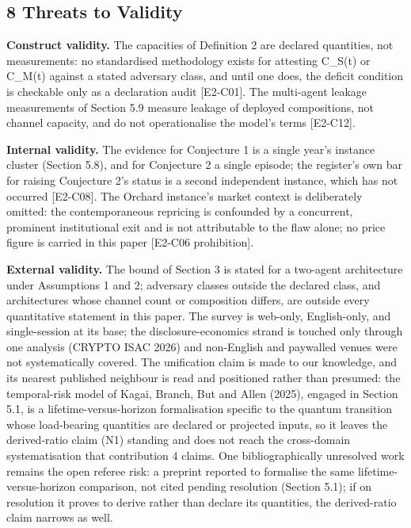 \documentclass[
  11pt,
]{article}
\begin{document}
\subsection{8 Threats to Validity}\label{threats-to-validity}

\textbf{Construct validity.} The capacities of Definition 2 are declared
quantities, not measurements: no standardised methodology exists for
attesting C\_S(t) or C\_M(t) against a stated adversary class, and until
one does, the deficit condition is checkable only as a declaration audit
{[}E2-C01{]}. The multi-agent leakage measurements of Section 5.9
measure leakage of deployed compositions, not channel capacity, and do
not operationalise the model's terms {[}E2-C12{]}.

\textbf{Internal validity.} The evidence for Conjecture 1 is a single
year's instance cluster (Section 5.8), and for Conjecture 2 a single
episode; the register's own bar for raising Conjecture 2's status is a
second independent instance, which has not occurred {[}E2-C08{]}. The
Orchard instance's market context is deliberately omitted: the
contemporaneous repricing is confounded by a concurrent, prominent
institutional exit and is not attributable to the flaw alone; no price
figure is carried in this paper {[}E2-C06 prohibition{]}.

\textbf{External validity.} The bound of Section 3 is stated for a
two-agent architecture under Assumptions 1 and 2; adversary classes
outside the declared class, and architectures whose channel count or
composition differs, are outside every quantitative statement in this
paper. The survey is web-only, English-only, and single-session at its
base; the disclosure-economics strand is touched only through one
analysis (CRYPTO ISAC 2026) and non-English and paywalled venues were
not systematically covered. The unification claim is made to our
knowledge, and its nearest published neighbour is read and positioned
rather than presumed: the temporal-risk model of Kagai, Branch, But and
Allen (2025), engaged in Section 5.1, is a lifetime-versus-horizon
formalisation specific to the quantum transition whose load-bearing
quantities are declared or projected inputs, so it leaves the
derived-ratio claim (N1) standing and does not reach the cross-domain
systematisation that contribution 4 claims. One bibliographically
unresolved work remains the open referee risk: a preprint reported to
formalise the same lifetime-versus-horizon comparison, not cited pending
resolution (Section 5.1); if on resolution it proves to derive rather
than declare its quantities, the derived-ratio claim narrows as well.
\end{document}
